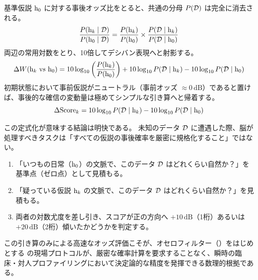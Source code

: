     基準仮説 $\mathrm{h}_0$ に対する事後オッズ比をとると、共通の分母 $P(\mathcal{D})$ は完全に消去される。
    \begin{equation}
        \frac{P(\mathrm{h}_k \mid \mathcal{D})}{P(\mathrm{h}_0 \mid \mathcal{D})} = \frac{P(\mathrm{h}_k)}{P(\mathrm{h}_0)} \times \frac{P(\mathcal{D} \mid \mathrm{h}_k)}{P(\mathcal{D} \mid \mathrm{h}_0)}
    \end{equation}
    両辺の常用対数をとり、10倍してデシバン表現へと射影する。
    \begin{equation}
        \Delta W(\mathrm{h}_k \text{ vs } \mathrm{h}_0) = 10 \log_{10}\left(\frac{P(\mathrm{h}_k)}{P(\mathrm{h}_0)}\right) + 10 \log_{10} P(\mathcal{D} \mid \mathrm{h}_k) - 10 \log_{10} P(\mathcal{D} \mid \mathrm{h}_0)
    \end{equation}
    初期状態において事前仮説がニュートラル（事前オッズ $\approx 0\,\text{dB}$）であると置けば、事後的な確信の変動量は極めてシンプルな引き算へと帰着する。
    \begin{equation}
        \Delta \text{Score}_k = 10 \log_{10} P(\mathcal{D} \mid \mathrm{h}_k) - 10 \log_{10} P(\mathcal{D} \mid \mathrm{h}_0)
    \end{equation}

    この定式化が意味する結論は明快である。
    未知のデータ $\mathcal{D}$ に遭遇した際、脳が処理すべきタスクは「すべての仮説の事後確率を厳密に規格化すること」ではない。
    \begin{enumerate}
        \item 「いつもの日常（$\mathrm{h}_0$）の文脈で、このデータ $\mathcal{D}$ はどれくらい自然か？」を基準点（ゼロ点）として見積もる。
        \item 「疑っている仮説 $\mathrm{h}_k$ の文脈で、このデータ $\mathcal{D}$ はどれくらい自然か？」を見積もる。
        \item 両者の対数尤度を差し引き、スコアが正の方向へ $+10\,\text{dB}$（1桁）あるいは $+20\,\text{dB}$（2桁）傾いたかどうかを判定する。
    \end{enumerate}

    この引き算のみによる高速なオッズ評価こそが、オセロフィルター（\fullOthelloFilter）をはじめとする \fullSNLP の現場プロトコルが、厳密な確率計算を要求することなく、瞬時の臨床・対人プロファイリングにおいて決定論的な精度を発揮できる数理的根拠である。
\else
